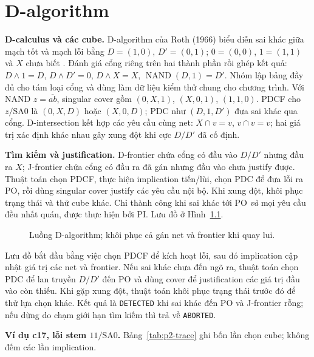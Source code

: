 \chapter{D-algorithm}
\label{sec:p2-d-algorithm}
\textbf{D-calculus và các cube.}
D-algorithm của Roth (1966) biểu diễn sai khác giữa mạch tốt và mạch lỗi
bằng $D=(1,0)$, $D'=(0,1)$; $0=(0,0)$, $1=(1,1)$ và $X$ chưa biết
\cite{p2_roth1966}. Đánh giá cổng riêng trên hai thành phần rồi ghép kết quả:
$D\land1=D$, $D\land D'=0$, $D\land X=X$,
$\operatorname{NAND}(D,1)=D'$. Nhóm lập bảng đầy đủ cho tám loại cổng và
dùng làm dữ liệu kiểm thử chung cho chương trình.
Với NAND $z=\overline{ab}$, singular cover gồm $(0,X,1)$, $(X,0,1)$,
$(1,1,0)$. PDCF cho $z/\mathrm{SA0}$ là $(0,X,D)$ hoặc $(X,0,D)$;
PDC như $(D,1,D')$ đưa sai khác qua cổng. D-intersection kết hợp
các yêu cầu cùng net: $X\cap v=v$, $v\cap v=v$; hai giá trị xác định khác
nhau gây xung đột khi cực $D/D'$ đã cố định.

\textbf{Tìm kiếm và justification.}
D-frontier chứa cổng có đầu vào $D/D'$ nhưng đầu ra $X$;
J-frontier chứa cổng có đầu ra đã gán nhưng đầu vào chưa justify được.
Thuật toán chọn PDCF, thực hiện implication tiến/lùi, chọn PDC để đưa lỗi
ra PO, rồi dùng singular cover justify các yêu cầu nội bộ. Khi xung đột,
khôi phục trạng thái và thử cube khác. Chỉ thành công khi sai khác tới PO
\emph{và} mọi yêu cầu đều nhất quán, được thực hiện bởi PI. Lưu đồ ở
Hình~\ref{fig:p2-flow}.
\begin{figure}[H]
\centering

\caption{Luồng D-algorithm; khôi phục cả gán net và frontier khi quay lui.}
\label{fig:p2-flow}
\end{figure}
Lưu đồ bắt đầu bằng việc chọn PDCF để kích hoạt lỗi, sau đó implication cập nhật giá trị các net và frontier. Nếu sai khác chưa đến ngõ ra, thuật toán chọn PDC để lan truyền $D/D'$ đến PO và dùng cover để justification các giá trị đầu vào còn thiếu. Khi gặp xung đột, thuật toán khôi phục trạng thái trước đó để thử lựa chọn khác. Kết quả là \texttt{DETECTED} khi sai khác đến PO và J-frontier rỗng; nếu dừng do chạm giới hạn tìm kiếm thì trả về \texttt{ABORTED}.

\textbf{Ví dụ c17, lỗi stem $11/\mathrm{SA0}$.}
Bảng~\ref{tab:p2-trace} ghi bốn lần chọn cube; không đếm các lần implication.

